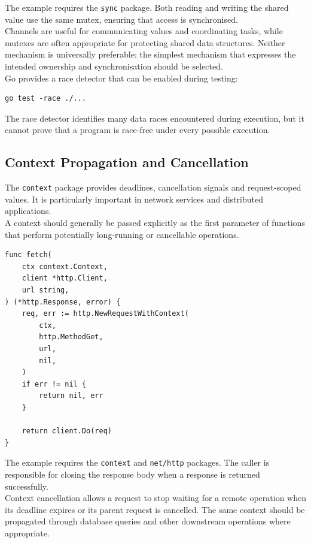 The example requires the \texttt{sync} package. Both reading and writing the shared value use the same mutex, ensuring that access is synchronised.\\

Channels are useful for communicating values and coordinating tasks, while mutexes are often appropriate for protecting shared data structures. Neither mechanism is universally preferable; the simplest mechanism that expresses the intended ownership and synchronisation should be selected.\\

Go provides a race detector that can be enabled during testing:

\begin{lstlisting}
go test -race ./...
\end{lstlisting}

The race detector identifies many data races encountered during execution, but it cannot prove that a program is race-free under every possible execution.

\subsection{Context Propagation and Cancellation}

The \texttt{context} package provides deadlines, cancellation signals and request-scoped values. It is particularly important in network services and distributed applications.\\

A context should generally be passed explicitly as the first parameter of functions that perform potentially long-running or cancellable operations.

\begin{lstlisting}
func fetch(
    ctx context.Context,
    client *http.Client,
    url string,
) (*http.Response, error) {
    req, err := http.NewRequestWithContext(
        ctx,
        http.MethodGet,
        url,
        nil,
    )
    if err != nil {
        return nil, err
    }

    return client.Do(req)
}
\end{lstlisting}

The example requires the \texttt{context} and \texttt{net/http} packages. The caller is responsible for closing the response body when a response is returned successfully.\\

Context cancellation allows a request to stop waiting for a remote operation when its deadline expires or its parent request is cancelled. The same context should be propagated through database queries and other downstream operations where appropriate.\\

